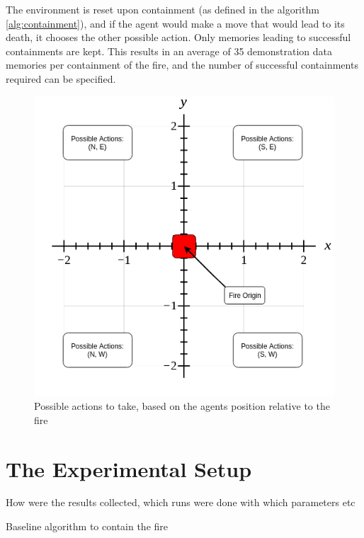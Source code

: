 The environment is reset upon containment (as defined in the algorithm \ref{alg:containment}), and if the agent would make a move that would lead to its death, it chooses the other possible action. Only memories leading to successful containments are kept. This results in an average of 35 demonstration data memories per containment of the fire, and the number of successful containments required can be specified.

\begin{figure}[h]
    \centering
    \includegraphics[width=1\linewidth]{img/Demo-data_Baseline.png}
    \caption{Possible actions to take, based on the agents position relative to the fire}
    \label{fig:demodata}
\end{figure}




\section{The Experimental Setup}\label{sec:experiment}
How were the results collected, which runs were done with which parameters etc

\begin{algorithm}
  \caption{Baseline algorithm to contain the fire}
  \label{alg:baseline}
  \begin{algorithmic}[1]
    \EndIf
    \EndWhile
    \State {}
    \EndProcedure
  \end{algorithmic}
\end{algorithm}
